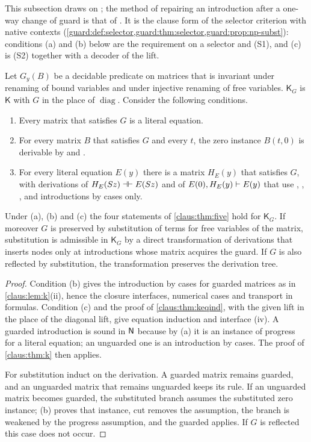 This subsection draws on ; the method of repairing an
introduction after a one-way change of guard is that of
. It is the clause form of the selector criterion
with native contexts (\cref{guard:def:selector,guard:thm:selector,guard:prop:np-subst}):
conditions (a) and (b) below are the requirement on a selector and (S1),
and (c) is (S2) together with a decoder of the lift.

Let $G_y(B)$ be a decidable predicate on matrices that is invariant under
renaming of bound variables and under injective renaming of free
variables. $\mathsf{K}_G$ is $\mathsf{K}$ with $G$ in the place of
$\operatorname{diag}$. Consider the following conditions.
\begin{enumerate}[label=(\alph*)]
\item Every matrix that satisfies $G$ is a literal equation.
\item For every matrix $B$ that satisfies $G$ and every $t$, the zero
instance $B(t,0)$ is derivable by  and .
\item For every literal equation $E(y)$ there is a matrix $H_E(y)$ that
satisfies $G$, with derivations of $H_E(S z)\dashv\vdash E(S z)$ and
of $E(0),H_E(y)\vdash E(y)$ that use , ,
,  and introductions by cases only.
\end{enumerate}

\begin{theorem}
\label{claus:thm:guard}
Under (a), (b) and (c) the four statements of \cref{claus:thm:five} hold
for $\mathsf{K}_G$. If moreover $G$ is preserved by substitution of terms
for free variables of the matrix, substitution is admissible in
$\mathsf{K}_G$ by a direct transformation of derivations that inserts
nodes only at introductions whose matrix acquires the guard. If $G$ is
also reflected by substitution, the transformation preserves the
derivation tree.
\end{theorem}
\begin{proof}
Condition (b) gives the introduction by cases for guarded matrices as in
\cref{claus:lem:k}(ii), hence the closure interfaces, numerical cases and
transport in formulas. Condition (c) and the proof of
\cref{claus:thm:keqind}, with the given lift in the place of the diagonal
lift, give equation induction and interface (iv). A guarded introduction
is sound in $\mathsf{N}$ because by (a) it is an instance of progress for a
literal equation; an unguarded one is an introduction by cases. The proof
of \cref{claus:thm:k} then applies.

For substitution induct on the derivation. A guarded matrix remains
guarded, and an unguarded matrix that remains unguarded keeps its rule.
If an unguarded matrix becomes guarded, the substituted branch assumes
the substituted zero instance; (b) proves that instance, cut removes the
assumption, the branch is weakened by the progress assumption, and the
guarded  applies. If $G$ is reflected this case does not
occur.
\end{proof}

